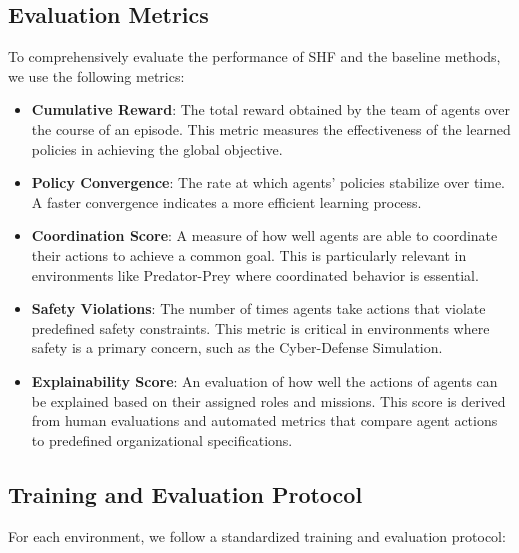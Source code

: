 \documentclass[sigconf,anonymous]{aamas}
\begin{document}
\subsection{Evaluation Metrics}
To comprehensively evaluate the performance of SHF and the baseline methods, we use the following metrics:

\begin{itemize}
    \item \textbf{Cumulative Reward}: The total reward obtained by the team of agents over the course of an episode. This metric measures the effectiveness of the learned policies in achieving the global objective.
    \item \textbf{Policy Convergence}: The rate at which agents' policies stabilize over time. A faster convergence indicates a more efficient learning process.
    \item \textbf{Coordination Score}: A measure of how well agents are able to coordinate their actions to achieve a common goal. This is particularly relevant in environments like Predator-Prey where coordinated behavior is essential.
    \item \textbf{Safety Violations}: The number of times agents take actions that violate predefined safety constraints. This metric is critical in environments where safety is a primary concern, such as the Cyber-Defense Simulation.
    \item \textbf{Explainability Score}: An evaluation of how well the actions of agents can be explained based on their assigned roles and missions. This score is derived from human evaluations and automated metrics that compare agent actions to predefined organizational specifications.
\end{itemize}

\subsection{Training and Evaluation Protocol}
For each environment, we follow a standardized training and evaluation protocol:
\end{document}
